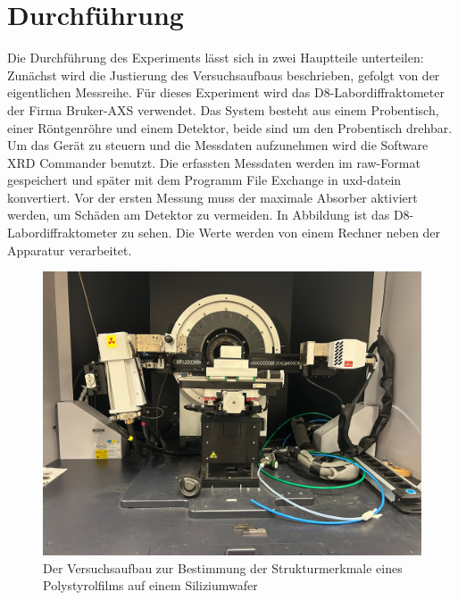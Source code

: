 \section{Durchführung}
\label{sec:Durchführung}
Die Durchführung des Experiments lässt sich in zwei Hauptteile unterteilen: Zunächst wird die Justierung des Versuchsaufbaus
beschrieben, gefolgt von der eigentlichen Messreihe. Für dieses Experiment wird das D8-Labordiffraktometer der Firma Bruker-AXS verwendet.
Das System besteht aus einem Probentisch, einer Röntgenröhre und einem Detektor, beide sind um den Probentisch drehbar. Um das
Gerät zu steuern und die Messdaten aufzunehmen wird die Software XRD Commander benutzt. Die erfassten Messdaten werden im 
raw-Format gespeichert und später mit dem Programm File Exchange in uxd-datein konvertiert. Vor der ersten Messung muss der maximale Absorber 
aktiviert werden, um Schäden am Detektor zu vermeiden.
In Abbildung \cite{fig:Abbildung 5} ist das D8-Labordiffraktometer zu sehen. Die Werte werden von einem
Rechner neben der Apparatur verarbeitet.

\begin{figure}
    \includegraphics[width=\textwidth]{bilder/aufbau.jpeg}
    \caption{Der Versuchsaufbau zur Bestimmung der Strukturmerkmale
    eines Polystyrolfilms auf einem Siliziumwafer}
    \label{fig:Abbildung 5}
\end{figure}

